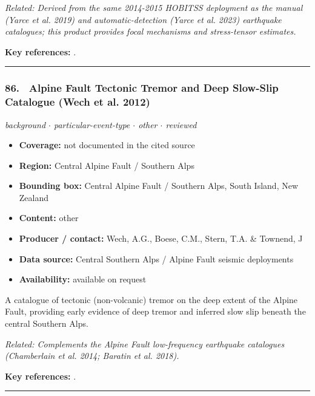 \documentclass[10pt,a4paper]{article}
\newcommand{\catentryrule}{\par\vspace{3pt}\noindent\textcolor{rulegrey}{\rule{\linewidth}{0.3pt}}\par\vspace{5pt}}
\newcommand{\kv}[2]{\item \textbf{#1:} #2}
\begin{document}
\par{\small\itshape Related: Derived from the same 2014-2015 HOBITSS deployment as the manual (Yarce et al. 2019) and automatic-detection (Yarce et al. 2023) earthquake catalogues; this product provides focal mechanisms and stress-tensor estimates.}
\par\vspace{2pt}\textbf{Key references:} \cite{WarrenSmith2019}.
\catentryrule
\subsubsection*{\hypertarget{c:86}{86.}~ Alpine Fault Tectonic Tremor and Deep Slow-Slip Catalogue (Wech et al. 2012)}
{\small\itshape background $\cdot$ particular-event-type $\cdot$ other $\cdot$ reviewed}\par\vspace{2pt}
\begin{itemize}[leftmargin=1.3em,itemsep=0.6pt,topsep=1pt,parsep=0pt]
\kv{Coverage}{not documented in the cited source}
\kv{Region}{Central Alpine Fault / Southern Alps}
\kv{Bounding box}{Central Alpine Fault / Southern Alps, South Island, New Zealand}
\kv{Content}{other}
\kv{Producer / contact}{Wech, A.G., Boese, C.M., Stern, T.A. \& Townend, J}
\kv{Data source}{Central Southern Alps / Alpine Fault seismic deployments}
\kv{Availability}{available on request}
\end{itemize}
\par\vspace{2pt}A catalogue of tectonic (non-volcanic) tremor on the deep extent of the Alpine Fault, providing early evidence of deep tremor and inferred slow slip beneath the central Southern Alps.
\par{\small\itshape Related: Complements the Alpine Fault low-frequency earthquake catalogues (Chamberlain et al. 2014; Baratin et al. 2018).}
\par\vspace{2pt}\textbf{Key references:} \cite{Wech2012}.
\catentryrule
\end{document}
